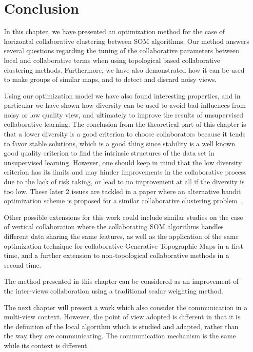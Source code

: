 \section{Conclusion}
\label{sec:cc-conlu}

In this chapter, we have presented an optimization method for the case of horizontal collaborative clustering between SOM algorithms. Our method answers several questions regarding the tuning of the collaborative parameters between local and collaborative terms when using topological based collaborative clustering methods. Furthermore, we have also demonstrated how it can be used to make groups of similar maps, and to detect and discard noisy views.

Using our optimization model we have also found interesting properties, and in particular we have shown how diversity can be used to avoid bad influences from noisy or low quality view, and ultimately to improve the results of unsupervised collaborative learning. The conclusion from the theoretical part of this chapter is that a lower diversity is a good criterion to choose collaborators because it tends to favor stable solutions, which is a good thing since stability is a well known good quality criterion to find the intrinsic structures of the data set in unsupervised learning. However, one should keep in mind that the low diversity criterion has its limits and may hinder improvements in the collaborative process due to the lack of risk taking, or lead to no improvement at all if the diversity is too low. These later 2 issues are tackled in a paper where an alternative bandit optimization scheme is proposed for a similar collaborative clustering problem~\cite{Sublime2018a2}. 

Other possible extensions for this work could include similar studies on the case of vertical collaboration where the collaborating SOM algorithms handles different data sharing the same features, as well as the application of the same optimization technique for collaborative Generative Topographic Maps in a first time, and a further extension to non-topological collaborative methods in a second time.

The method presented in this chapter can be considered as an improvement of the inter-views collaboration using a traditional scalar weighting method. 

The next chapter will present a work which also consider the communication in a multi-view context. However, the point of view adopted is different in that it is the definition of the local algorithm which is studied and adapted, rather than the way they are communicating. The communication mechanism is the same while its context is different.
